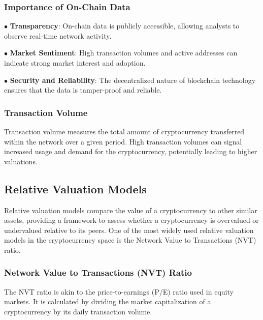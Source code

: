 \documentclass{ledger}
\begin{document}
\subsubsection{Importance of On-Chain Data}

$ \bullet $ \textbf{Transparency}: On-chain data is publicly accessible, allowing analysts to observe real-time network activity.

$ \bullet $ \textbf{Market Sentiment}: High transaction volumes and active addresses can indicate strong market interest and adoption.

$ \bullet $ \textbf{Security and Reliability}: The decentralized nature of blockchain technology ensures that the data is tamper-proof and reliable.

\hfill \break

\subsubsection{Transaction Volume}

Transaction volume measures the total amount of cryptocurrency transferred within the network over a given period. High transaction volumes can signal increased usage and demand for the cryptocurrency, potentially leading to higher valuations.

\hfill \break

\subsection{Relative Valuation Models}

Relative valuation models compare the value of a cryptocurrency to other similar assets, providing a framework to assess whether a cryptocurrency is overvalued or undervalued relative to its peers. One of the most widely used relative valuation models in the cryptocurrency space is the Network Value to Transactions (NVT) ratio.

\hfill \break

\subsubsection{Network Value to Transactions (NVT) Ratio}

\hfill \break

The NVT ratio is akin to the price-to-earnings (P/E) ratio used in equity markets. It is calculated by dividing the market capitalization of a cryptocurrency by its daily transaction volume.
\end{document}
